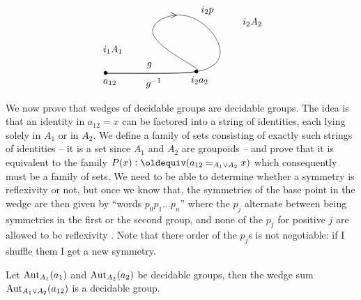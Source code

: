 {%
$$
\xy (-20,20)*+{};(-20,20)*+{}
**\crv{(15,20)&(18,20)&(-10,35)&(10,45)&(25,30)&(20,19)&(0,20)}
?(0)*{} *!LD!/^-20pt/{i_1A_1}
?(.45)*{} *!LD!/^2pt/{>}
?(.95)*{} *!LD!/^-15pt/{g^{-1}}
?(.03)*{} *!LD!/^-5pt/{g}
?(.55)*{} *!LD!/^-7pt/{i_2p}
?(.65)*{} *!LD!/^-30pt/{i_2A_2}
?(.87)*{} *!LD!/^-12pt/{i_2a_2}
?(.86)*{} *!LD!/^-2pt/{\bullet}
?(1)*{} *!LD!/^-2pt/{\bullet}
?(1)*{} *!LD!/^-12pt/{a_{12}}
\endxy
$$

We now prove that wedges of decidable groups are decidable groups.   The idea is that an identity in $a_{12}=x$ can be factored into a string of identities, each lying solely in $A_1$ or in $A_2$.  We define a family of sets consisting of exactly such strings of identities --  it is a set since $A_1$ and $A_2$ are groupoids -- and prove that it is equivalent to the family $P(x)\defequi(a_{12}=_{A_1\vee A_2}x)$ which consequently must be a family of sets.
We need to be able to determine whether a symmetry is reflexivity or not, but once we know that, the symmetries of the base point in the wedge are then given by ``words $p_0p_1\dots p_n$'' where the $p_j$ alternate between being symmetries in the first or the second group, and none of the $p_j$ for positive $j$ are allowed to be reflexivity%
.  Note that there order of the $p_j$s is not negotiable: if I shuffle them I get a new symmetry.
\begin{lemma}
  \label{lem:wedgeofgpoidisgpoid}
  Let $\mathrm{Aut}_{A_1}(a_1)$ and $\mathrm{Aut}_{A_2}(a_2)$ be decidable groups, then the wedge sum $\mathrm{Aut}_{A_1\vee A_2}(a_{12})$ is a decidable group.  


\end{lemma}}
